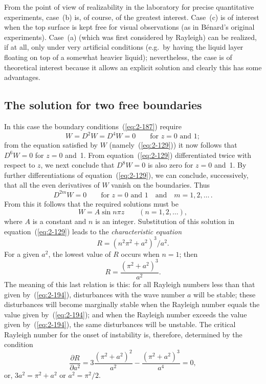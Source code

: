 From the point of view of realizability in the laboratory for precise
quantitative experiments, case~(b) is, of course, of the greatest interest.
Case~(c) is of interest when the top surface is kept free for visual observations (as in B\'enard's original experiments). Case~(a) (which was first
considered by Rayleigh) can be realized, if at all, only under very
artificial conditions (e.g.\ by having the liquid layer floating on top of a
somewhat heavier liquid); nevertheless, the case is of theoretical interest
because it allows an explicit solution and clearly this has some
advantages.

\subsection{The solution for two free boundaries}\label{sec:15a}

In this case the boundary conditions~(\ref{eq:2-187}) require
\begin{equation}
\label{eq:2-190}
W = D^2W = D^4W = 0 \qquad\text{for } z = 0 \text{ and } 1;
\end{equation}
from the equation satisfied by $W$ (namely~(\ref{eq:2-129})) it now follows that
$D^6W = 0$ for $z = 0$ and~1. From equation~(\ref{eq:2-129}) differentiated twice
with respect to $z$, we next conclude that $D^8W = 0$ is also zero for $z = 0$
and~1. By further differentiations of equation~(\ref{eq:2-129}), we can conclude,
successively, that all the even derivatives of $W$ vanish on the boundaries.
Thus
\begin{equation}
\label{eq:2-191}
D^{2m}W = 0 \qquad\text{for } z = 0 \text{ and } 1 \quad\text{and}\quad m = 1, 2, \ldots\,.
\end{equation}
From this it follows that the required solutions must be
\begin{equation}
\label{eq:2-192}
W = A\sin n\pi z \qquad(n = 1, 2, \ldots),
\end{equation}
where $A$ is a constant and $n$ is an integer. Substitution of this solution
in equation~(\ref{eq:2-129}) leads to the \emph{characteristic equation}
\begin{equation}
\label{eq:2-193}
R = (n^2\pi^2+a^2)^3/a^2.
\end{equation}
For a given $a^2$, the lowest value of $R$ occurs when $n = 1$; then
\begin{equation}
\label{eq:2-194}
R = \frac{(\pi^2+a^2)^3}{a^2}.
\end{equation}
The meaning of this last relation is this: for all Rayleigh numbers less
than that given by~(\ref{eq:2-194}), disturbances with the wave number $a$ will be
stable; these disturbances will become marginally stable when the
Rayleigh number equals the value given by~(\ref{eq:2-194}); and when the Rayleigh
number exceeds the value given by~(\ref{eq:2-194}), the same disturbances will
be unstable. The critical Rayleigh number for the onset of instability
is, therefore, determined by the condition
\begin{equation}
\label{eq:2-195}
\frac{\partial R}{\partial a^2} = 3\frac{(\pi^2+a^2)^2}{a^2}-\frac{(\pi^2+a^2)^3}{a^4} = 0,
\end{equation}
or, \qquad $3a^2 = \pi^2+a^2$ \quad or \quad $a^2 = \pi^2/2$.

